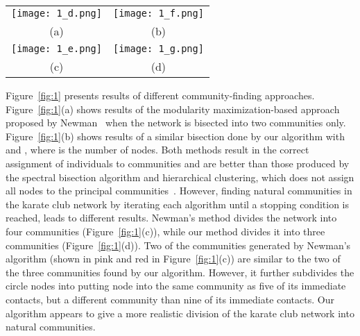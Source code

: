 \documentclass{sig-alternate}
\newcommand{\figref}[1]{Figure~\ref{#1}}
\begin{document}
\begin{figure*}[tbh]
\begin{tabular}{cc}
\texttt{[image: 1\_d.png]} &
    \texttt{[image: 1\_f.png]}\\
  (a) & (b) \\
 \texttt{[image: 1\_e.png]} &
 \texttt{[image: 1\_g.png]}\\
(c) & (d) 
\end{tabular}
\caption{ Results of applying different community finding algorithms to Zachary's karate club network. The numbered vertices represent the members of the club and edges represent friendships. The factions in which the clubs split up during the course of study are shown by squares and circles. 
(a \& b) Communities found after running a single iteration (graph bisection) using (a) Newman's and (b) the proposed algorithms.
(c \& d) Natural communities found by running (c) Newman's algorithm and (d) the proposed algorith until termination condition is reached.
}
 \label{fig:1}
\end{figure*}



\figref{fig:1} presents results of different community-finding approaches. \figref{fig:1}(a) shows results of the  modularity maximization-based approach proposed by Newman~\cite{Newman204}  when the network is bisected into two communities only. \figref{fig:1}(b) shows results of a similar bisection done by our algorithm with  and , where  is the number of nodes. Both methods result in the correct assignment of individuals to communities and are better than those produced by the spectral bisection algorithm and hierarchical clustering, which does not assign all nodes to the principal communities~\cite{Newman206}.
However, finding natural communities in the karate club network by iterating each algorithm until a stopping condition is reached, leads to different results. Newman's method divides the network into four communities (\figref{fig:1}(c)), while our method divides it into three communities (\figref{fig:1}(d)). Two of the communities generated by Newman's algorithm (shown in pink and red in \figref{fig:1}(c))  are similar to the two of the three communities found by our algorithm. However, it further subdivides the circle nodes into 
putting node  into the same community as five of its immediate contacts, but a different community than nine of its immediate contacts.
Our algorithm appears to give a more realistic division of the karate club network into natural communities.
\end{document}
